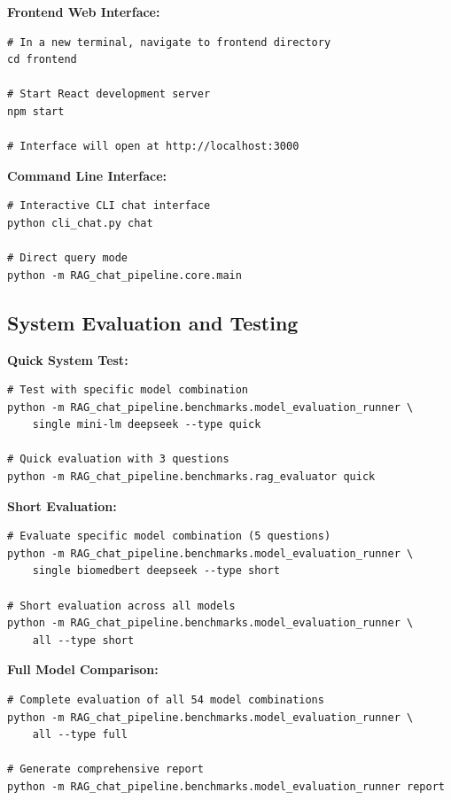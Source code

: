\textbf{Frontend Web Interface:}
\begin{verbatim}
# In a new terminal, navigate to frontend directory
cd frontend

# Start React development server
npm start

# Interface will open at http://localhost:3000
\end{verbatim}

\textbf{Command Line Interface:}
\begin{verbatim}
# Interactive CLI chat interface
python cli_chat.py chat

# Direct query mode
python -m RAG_chat_pipeline.core.main
\end{verbatim}

\subsection{System Evaluation and Testing}

\textbf{Quick System Test:}
\begin{verbatim}
# Test with specific model combination
python -m RAG_chat_pipeline.benchmarks.model_evaluation_runner \
    single mini-lm deepseek --type quick

# Quick evaluation with 3 questions
python -m RAG_chat_pipeline.benchmarks.rag_evaluator quick
\end{verbatim}

\textbf{Short Evaluation:}
\begin{verbatim}
# Evaluate specific model combination (5 questions)
python -m RAG_chat_pipeline.benchmarks.model_evaluation_runner \
    single biomedbert deepseek --type short

# Short evaluation across all models
python -m RAG_chat_pipeline.benchmarks.model_evaluation_runner \
    all --type short
\end{verbatim}

\textbf{Full Model Comparison:}
\begin{verbatim}
# Complete evaluation of all 54 model combinations
python -m RAG_chat_pipeline.benchmarks.model_evaluation_runner \
    all --type full

# Generate comprehensive report
python -m RAG_chat_pipeline.benchmarks.model_evaluation_runner report
\end{verbatim}

